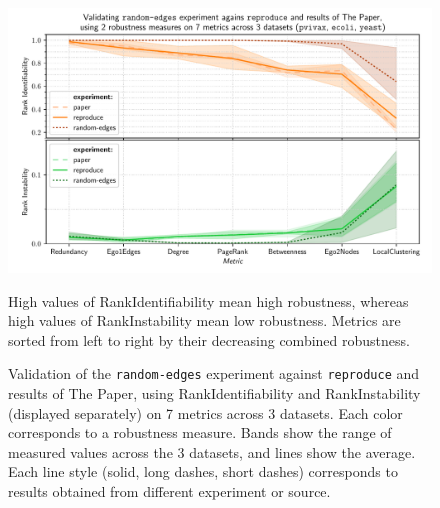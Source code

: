 \begin{figure}
    \includegraphics[width=\linewidth]{plot_random_edges.pdf}
    \vspace*{-0.6cm}
    \caption{Validation of the \texttt{random-edges} experiment against \texttt{reproduce} and results of The Paper, using RankIdentifiability and RankInstability (displayed separately) on 7 metrics across 3 datasets.
    Each color corresponds to a robustness measure.
    Bands show the range of measured values across the 3 datasets, and lines show the average.
    Each line style (solid, long dashes, short dashes) corresponds to results obtained from different experiment or source.}
    \label{fig:plot_random_edges}
    \footnotesize\justify\vspace{-0.4\baselineskip}
    High values of RankIdentifiability mean high robustness, whereas high values of RankInstability mean low robustness.
    Metrics are sorted from left to right by their decreasing combined robustness.
\end{figure}
